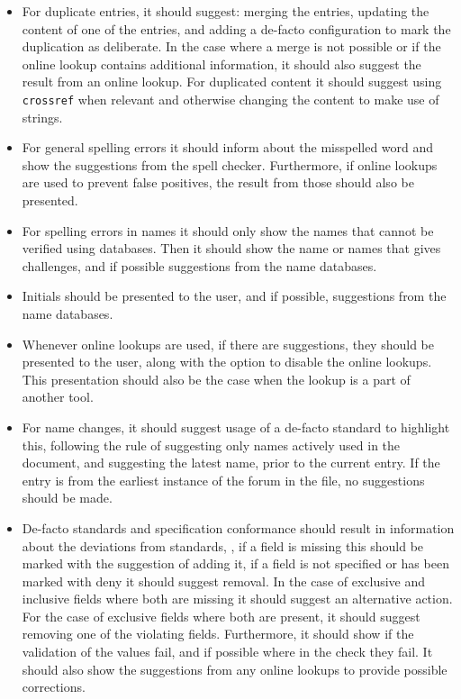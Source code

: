 \begin{itemize}
\item For duplicate entries, it should suggest: merging the entries,
  updating the content of one of the entries, and adding a de-facto
  configuration to mark the duplication as deliberate.  In the case
  where a merge is not possible or if the online lookup contains
  additional information, it should also suggest the result from an
  online lookup.  For duplicated content it should suggest using
  \texttt{crossref} when relevant and otherwise changing the content
  to make use of strings.

\item For general spelling errors it should inform about the
  misspelled word and show the suggestions from the spell checker.
  Furthermore, if online lookups are used to prevent false positives,
  the result from those should also be presented.

\item For spelling errors in names it should only show the names that
  cannot be verified using databases.  Then it should show the name or
  names that gives challenges, and if possible suggestions from the
  name databases.

\item Initials should be presented to the user, and if possible,
  suggestions from the name databases.

\item Whenever online lookups are used, if there are suggestions, they
  should be presented to the user, along with the option to disable
  the online lookups.  This presentation should also be the case when
  the lookup is a part of another tool.

\item For name changes, it should suggest usage of a de-facto standard
  to highlight this, following the rule of suggesting only names
  actively used in the document, and suggesting the latest name, prior
  to the current entry.  If the entry is from the earliest instance of
  the forum in the file, no suggestions should be made.

\item De-facto standards and specification conformance should result
  in information about the deviations from standards, \ie, if a field
  is missing this should be marked with the suggestion of adding it,
  if a field is not specified or has been marked with deny it should
  suggest removal.  In the case of exclusive and inclusive fields
  where both are missing it should suggest an alternative action.  For
  the case of exclusive fields where both are present, it should
  suggest removing one of the violating fields.  Furthermore, it
  should show if the validation of the values fail, and if possible
  where in the check they fail.  It should also show the suggestions
  from any online lookups to provide possible corrections.


\end{itemize}
